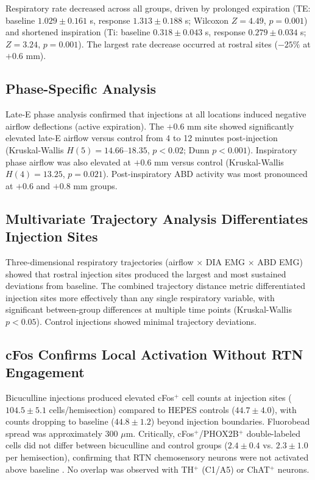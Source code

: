 \documentclass[12pt]{article}
\begin{document}
Respiratory rate decreased across all groups, driven by prolonged expiration (TE: baseline $1.029 \pm 0.161$ s, response $1.313 \pm 0.188$ s; Wilcoxon $Z = 4.49$, $p = 0.001$) and shortened inspiration (Ti: baseline $0.318 \pm 0.043$ s, response $0.279 \pm 0.034$ s; $Z = 3.24$, $p = 0.001$). The largest rate decrease occurred at rostral sites ($-25\%$ at $+0.6$ mm).

\subsection{Phase-Specific Analysis}

Late-E phase analysis confirmed that injections at all locations induced negative airflow deflections (active expiration). The $+0.6$ mm site showed significantly elevated late-E airflow versus control from 4 to 12 minutes post-injection (Kruskal-Wallis $H(5) = 14.66$--$18.35$, $p < 0.02$; Dunn $p < 0.001$). Inspiratory phase airflow was also elevated at $+0.6$ mm versus control (Kruskal-Wallis $H(4) = 13.25$, $p = 0.021$). Post-inspiratory ABD activity was most pronounced at $+0.6$ and $+0.8$ mm groups.

\subsection{Multivariate Trajectory Analysis Differentiates Injection Sites}

Three-dimensional respiratory trajectories (airflow $\times$ DIA EMG $\times$ ABD EMG) showed that rostral injection sites produced the largest and most sustained deviations from baseline. The combined trajectory distance metric differentiated injection sites more effectively than any single respiratory variable, with significant between-group differences at multiple time points (Kruskal-Wallis $p < 0.05$). Control injections showed minimal trajectory deviations.

\subsection{cFos Confirms Local Activation Without RTN Engagement}

Bicuculline injections produced elevated cFos$^+$ cell counts at injection sites ($104.5 \pm 5.1$ cells/hemisection) compared to HEPES controls ($44.7 \pm 4.0$), with counts dropping to baseline ($44.8 \pm 1.2$) beyond injection boundaries. Fluorobead spread was approximately 300 $\mu$m. Critically, cFos$^+$/PHOX2B$^+$ double-labeled cells did not differ between bicuculline and control groups ($2.4 \pm 0.4$ vs. $2.3 \pm 1.0$ per hemisection), confirming that RTN chemosensory neurons were not activated above baseline \citep{stornetta2006phox2b, guyenet2019rtn}. No overlap was observed with TH$^+$ (C1/A5) or ChAT$^+$ neurons.
\end{document}
